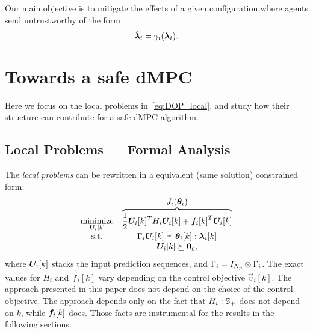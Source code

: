 \documentclass{ifacconf}  %
\begin{document}
Our main objective is to mitigate the effects of a given configuration where agents send untrustworthy of the form
\begin{equation*}
\tilde{\boldsymbol{\lambda}}_i=\gamma_{i}(\boldsymbol{\lambda}_i).
\end{equation*}

\section{Towards a safe dMPC}\label{sec:TSM}

Here we focus on the local problems in~\eqref{eq:DOP_local}, and study how their structure can contribute for a safe dMPC algorithm.

\subsection{Local Problems --- Formal Analysis}\label{ssec:FA}

The \emph{local problems} can be rewritten in a equivalent (same solution) constrained \qp{} form:
\begin{equation}\label{eq:quadratic_case}
\begin{matrix}
\underset{\Uik}{\mathrm{minimize}}& \overbrace{\frac{1}{2} \Uik^T H_i\Uik+{\fik}^T\Uik}^{\textstyle J_{i}(\vec{\theta}_{i})}\\
\mathrm{s.t.}&\bar{\Gamma}_{i}\Uik\preceq\vec{\theta}_{i}[k]:\vec{\lambda}_{i}[k]\\
&\Uik\succeq\0_{c},
\end{matrix}
\end{equation}
where ${\Uik}$ stacks the input prediction sequences, and
${\relax{\Gamma}_{i}=I_{N_{p}}\mathbin{\otimes}\Gamma_{i}}$.
The exact values for $H_{i}$ and $\vec{f}_{i}[k]$ vary depending on the control objective $\vec{v}_{i}[k]$. The approach presented in this paper does not depend on the choice of the control objective.
The approach depends only on the fact that $H_{i}:\mathbb{S}_{+}$ does not depend on $k$, while $\fik$ does. Those facts are instrumental for the results in the following sections.

\end{document}

